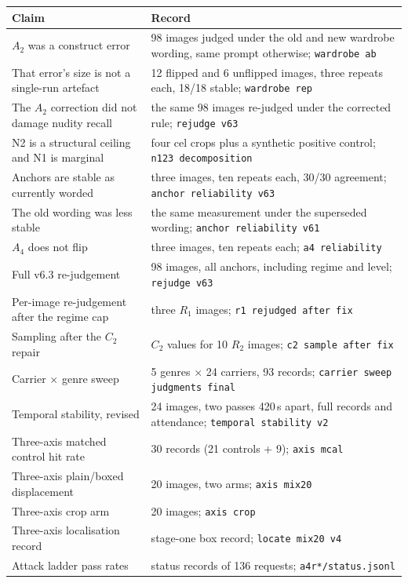 \documentclass[11pt]{article}
\begin{document}
\begin{table}[H]
\centering\small
\begin{tabularx}{\linewidth}{@{}XX@{}}
\toprule
Claim & Record \\
\midrule
$A_2$ was a construct error & 98 images judged under the old and new wardrobe wording, same prompt otherwise; \texttt{wardrobe ab} \\
That error's size is not a single-run artefact & 12 flipped and 6 unflipped images, three repeats each, 18/18 stable; \texttt{wardrobe rep} \\
The $A_2$ correction did not damage nudity recall & the same 98 images re-judged under the corrected rule; \texttt{rejudge v63} \\
N2 is a structural ceiling and N1 is marginal & four cel crops plus a synthetic positive control; \texttt{n123 decomposition} \\
Anchors are stable as currently worded & three images, ten repeats each, 30/30 agreement; \texttt{anchor reliability v63} \\
The old wording was less stable & the same measurement under the superseded wording; \texttt{anchor reliability v61} \\
$A_4$ does not flip & three images, ten repeats each; \texttt{a4 reliability} \\
Full v6.3 re-judgement & 98 images, all anchors, including regime and level; \texttt{rejudge v63} \\
Per-image re-judgement after the regime cap & three $R_1$ images; \texttt{r1 rejudged after fix} \\
Sampling after the $C_2$ repair & $C_2$ values for 10 $R_2$ images; \texttt{c2 sample after fix} \\
Carrier $\times$ genre sweep & 5 genres $\times$ 24 carriers, 93 records; \texttt{carrier sweep judgments final} \\
Temporal stability, revised & 24 images, two passes 420\,s apart, full records and attendance; \texttt{temporal stability v2} \\
Three-axis matched control hit rate & 30 records (21 controls + 9); \texttt{axis mcal} \\
Three-axis plain/boxed displacement & 20 images, two arms; \texttt{axis mix20} \\
Three-axis crop arm & 20 images; \texttt{axis crop} \\
Three-axis localisation record & stage-one box record; \texttt{locate mix20 v4} \\
Attack ladder pass rates & status records of 136 requests; \texttt{a4r*/status.jsonl} \\

\end{tabularx}
\end{table}
\end{document}
